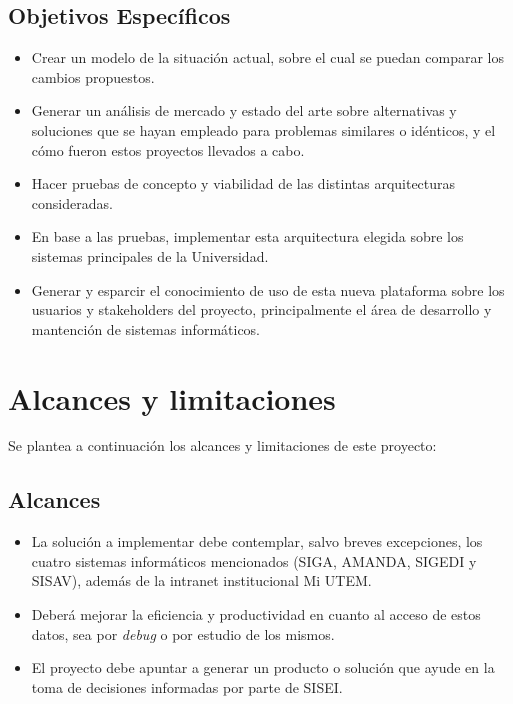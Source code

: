 \subsection{Objetivos Específicos}

\begin{itemize}
	\item Crear un modelo de la situación actual, sobre el cual se puedan comparar los cambios propuestos.
	\item Generar un análisis de mercado y estado del arte sobre alternativas y soluciones que se hayan empleado para problemas similares o idénticos, y el cómo fueron estos proyectos llevados a cabo.
	\item Hacer pruebas de concepto y viabilidad de las distintas arquitecturas consideradas.
	\item En base a las pruebas, implementar esta arquitectura elegida sobre los sistemas principales de la Universidad.
	\item Generar y esparcir el conocimiento de uso de esta nueva plataforma sobre los usuarios y stakeholders del proyecto, principalmente el área de desarrollo y mantención de sistemas informáticos.
\end{itemize}

\section{Alcances y limitaciones}

Se plantea a continuación los alcances y limitaciones de este proyecto:

\subsection{Alcances}

\begin{itemize}
	\item La solución a implementar debe contemplar, salvo breves excepciones, los cuatro sistemas informáticos mencionados (SIGA, AMANDA, SIGEDI y SISAV), además de la intranet institucional Mi UTEM.
	\item Deberá mejorar la eficiencia y productividad en cuanto al acceso de estos datos, sea por \textit{debug} o por estudio de los mismos.
	\item El proyecto debe apuntar a generar un producto o solución que ayude en la toma de decisiones informadas por parte de SISEI.
\end{itemize}

